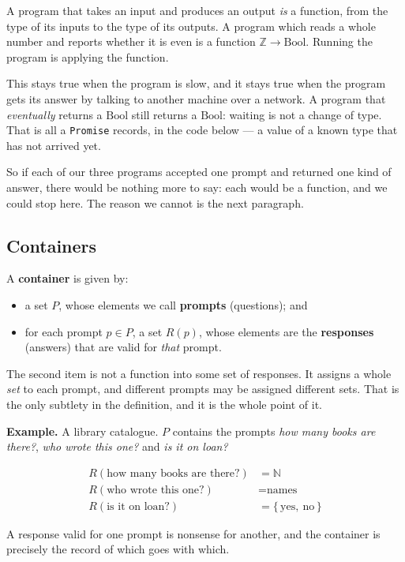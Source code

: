 \documentclass[11pt,a4paper]{article}
\newcommand{\ZZ}{\mathbb{Z}}
\newcommand{\NN}{\mathbb{N}}
\begin{document}
A program that takes an input and produces an output \emph{is} a function, from
the type of its inputs to the type of its outputs. A program which reads a
whole number and reports whether it is even is a function
$\ZZ \to \mathrm{Bool}$. Running the program is applying the function.

This stays true when the program is slow, and it stays true when the program
gets its answer by talking to another machine over a network. A program that
\emph{eventually} returns a $\mathrm{Bool}$ still returns a $\mathrm{Bool}$:
waiting is not a change of type. That is all a \texttt{Promise}
records, in the code below --- a value of a known type that has not arrived
yet.

So if each of our three programs accepted one prompt and returned one kind of
answer, there would be nothing more to say: each would be a function, and we
could stop here. The reason we cannot is the next paragraph.

\subsection*{Containers}

A \textbf{container} is given by:

\begin{itemize}
\item a set $P$, whose elements we call \textbf{prompts} (questions); and
\item for each prompt $p \in P$, a set $R(p)$, whose elements are the
      \textbf{responses} (answers) that are valid for \emph{that} prompt.
\end{itemize}

The second item is not a function into some set of responses. It assigns a
whole \emph{set} to each prompt, and different prompts may be assigned
different sets. That is the only subtlety in the definition, and it is the
whole point of it.

\begin{keybox}
\textbf{Example.} A library catalogue. $P$ contains the prompts \emph{how many
books are there?}, \emph{who wrote this one?} and \emph{is it on loan?}

\[
\begin{aligned}
R(\text{how many books are there?}) &= \NN \\
R(\text{who wrote this one?})       &= \text{names} \\
R(\text{is it on loan?})            &= \{\,\text{yes},\ \text{no}\,\}
\end{aligned}
\]

A response valid for one prompt is nonsense for another, and the container is
precisely the record of which goes with which.
\end{keybox}
\end{document}
